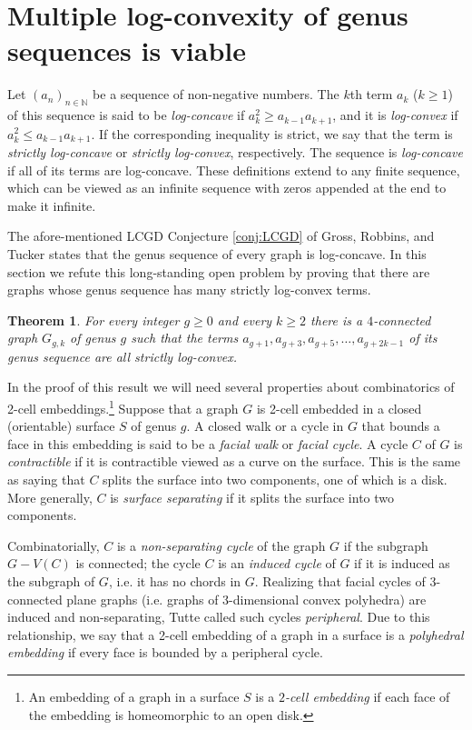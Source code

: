 \documentclass[11pt]{article}
\newtheorem{theorem}{Theorem}
\begin{document}
\section{Multiple log-convexity of genus sequences is viable}

Let $(a_n)_{n\in \mathbb N}$ be a sequence of non-negative numbers. The $k$th term $a_k$ ($k\ge1$) of this sequence is said to be \emph{log-concave} if $a_k^2 \ge a_{k-1} a_{k+1}$, and it is \emph{log-convex} if $a_k^2 \le a_{k-1} a_{k+1}$. If the corresponding inequality is strict, we say that the term is \emph{strictly log-concave} or \emph{strictly log-convex}, respectively. The sequence is \emph{log-concave} if all of its terms are log-concave. These definitions extend to any finite sequence, which can be viewed as an infinite sequence with zeros appended at the end to make it infinite.


The afore-mentioned LCGD Conjecture \ref{conj:LCGD} of Gross, Robbins, and Tucker \cite{GrRoTu89} states that the genus sequence of every graph is log-concave. In this section we refute this long-standing open problem by proving that there are graphs whose genus sequence has many strictly log-convex terms.

\begin{theorem}
\label{thm:main}
  For every integer $g\ge0$ and every $k\ge2$ there is a $4$-connected graph $G_{g,k}$ of genus $g$ such that the terms $a_{g+1},a_{g+3},a_{g+5},\dots,a_{g+2k-1}$ of its genus sequence are all strictly log-convex.
\end{theorem}

In the proof of this result we will need several properties about combinatorics of 2-cell embeddings.\footnote{An embedding of a graph in a surface $S$ is a \emph{$2$-cell embedding} if each face of the embedding is homeomorphic to an open disk.}
Suppose that a graph $G$ is 2-cell embedded in a closed (orientable) surface $S$ of genus $g$.
A closed walk or a cycle in $G$ that bounds a face in this embedding is said to be a \emph{facial walk} or \emph{facial cycle}. A cycle $C$ of $G$ is \emph{contractible} if it is contractible viewed as a curve on the surface. This is the same as saying that $C$ splits the surface into two components, one of which is a disk. More generally, $C$ is \emph{surface separating} if it splits the surface into two components.

Combinatorially, $C$ is a \emph{non-separating cycle} of the graph $G$ if the subgraph $G-V(C)$ is connected; the cycle $C$ is an \emph{induced cycle} of $G$ if it is induced as the subgraph of $G$, i.e. it has no chords in $G$. Realizing that facial cycles of 3-connected plane graphs (i.e. graphs of 3-dimensional convex polyhedra) are induced and non-separating, Tutte \cite{Tu63} called such cycles \emph{peripheral}. Due to this relationship, we say that a 2-cell embedding of a graph in a surface is a \emph{polyhedral embedding} if every face is bounded by a peripheral cycle.
\end{document}
